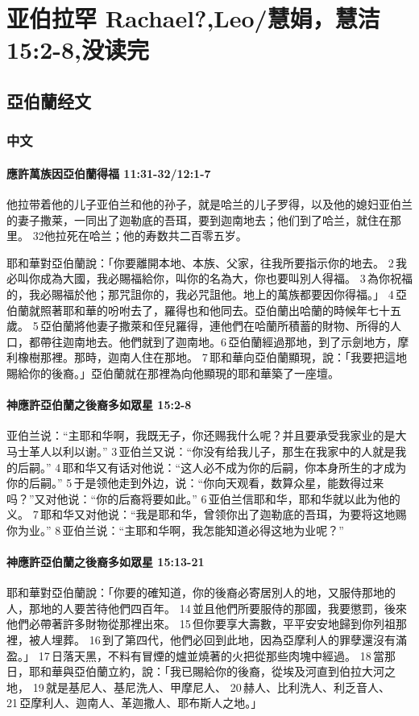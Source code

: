 \chapter{亚伯拉罕 Rachael?,Leo/慧娟，慧洁 15:2-8,没读完}
\section{亞伯蘭经文}
\subsection{中文}
\subsubsection{應許萬族因亞伯蘭得福 11:31-32/12:1-7}
他拉带着他的儿子亚伯兰和他的孙子，就是哈兰的儿子罗得，以及他的媳妇亚伯兰的妻子撒莱，一同出了迦勒底的吾珥，要到迦南地去；他们到了哈兰，就住在那里。 32他拉死在哈兰；他的寿数共二百零五岁。

耶和華對亞伯蘭說：「你要離開本地、本族、父家，往我所要指示你的地去。 2 我必叫你成為大國，我必賜福給你，叫你的名為大，你也要叫別人得福。 3 為你祝福的，我必賜福於他；那咒詛你的，我必咒詛他。地上的萬族都要因你得福。」 4 亞伯蘭就照著耶和華的吩咐去了，羅得也和他同去。亞伯蘭出哈蘭的時候年七十五歲。 5 亞伯蘭將他妻子撒萊和侄兒羅得，連他們在哈蘭所積蓄的財物、所得的人口，都帶往迦南地去。他們就到了迦南地。6 亞伯蘭經過那地，到了示劍地方，摩利橡樹那裡。那時，迦南人住在那地。 7 耶和華向亞伯蘭顯現，說：「我要把這地賜給你的後裔。」亞伯蘭就在那裡為向他顯現的耶和華築了一座壇。 





\subsubsection{神應許亞伯蘭之後裔多如眾星 15:2-8}
亚伯兰说：“主耶和华啊，我既无子，你还赐我什么呢？并且要承受我家业的是大马士革人以利以谢。” 3 亚伯兰又说：“你没有给我儿子，那生在我家中的人就是我的后嗣。” 4 耶和华又有话对他说：“这人必不成为你的后嗣，你本身所生的才成为你的后嗣。” 5 于是领他走到外边，说：“你向天观看，数算众星，能数得过来吗？”又对他说：“你的后裔将要如此。” 6 亚伯兰信耶和华，耶和华就以此为他的义。 7 耶和华又对他说：“我是耶和华，曾领你出了迦勒底的吾珥，为要将这地赐你为业。” 8 亚伯兰说：“主耶和华啊，我怎能知道必得这地为业呢？” 
\subsubsection{神應許亞伯蘭之後裔多如眾星 15:13-21}
耶和華對亞伯蘭說：「你要的確知道，你的後裔必寄居別人的地，又服侍那地的人，那地的人要苦待他們四百年。 14 並且他們所要服侍的那國，我要懲罰，後來他們必帶著許多財物從那裡出來。 15 但你要享大壽數，平平安安地歸到你列祖那裡，被人埋葬。 16 到了第四代，他們必回到此地，因為亞摩利人的罪孽還沒有滿盈。」 17 日落天黑，不料有冒煙的爐並燒著的火把從那些肉塊中經過。 18 當那日，耶和華與亞伯蘭立約，說：「我已賜給你的後裔，從埃及河直到伯拉大河之地， 19 就是基尼人、基尼洗人、甲摩尼人、 20 赫人、比利洗人、利乏音人、 21 亞摩利人、迦南人、革迦撒人、耶布斯人之地。」




